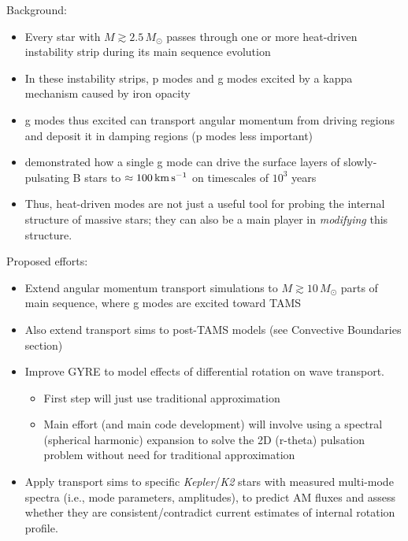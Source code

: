 {Background:
 \begin{itemize}
 \item Every star with $M \gtrsim 2.5\,M_{\odot}$ passes through one or more heat-driven instability strip during its main sequence evolution
 \item In these instability strips, p modes and g modes excited by a kappa mechanism caused by iron opacity
 \item g modes thus excited can transport angular momentum from driving regions and deposit it in damping regions (p modes less important)
 \item \citet{Townsend:2017aa} demonstrated how a single g mode can drive the surface layers of slowly-pulsating B stars to $\approx 100\,{\rm km\,s^{-1}}$ on timescales of $10^{3}$ years
 \item Thus, heat-driven modes are not just a useful tool for probing the internal structure of massive stars; they can also be a main player in \emph{modifying} this structure.
 \end{itemize}
 
 Proposed efforts:
 \begin{itemize}
 \item Extend angular momentum transport simulations to $M \gtrsim 10\,M_{\odot}$ parts of main sequence, where g modes are excited toward TAMS
 \item Also extend transport sims to post-TAMS models (see Convective Boundaries section)
 \item Improve GYRE to model effects of differential rotation on wave transport.
 \begin{itemize}
 \item First step will just use traditional approximation
 \item Main effort (and main code development) will involve using a spectral (spherical harmonic) expansion to solve the 2D (r-theta) pulsation problem without need for traditional approximation
 \end{itemize}
 \item Apply transport sims to specific \emph{Kepler}/\emph{K2} stars with measured multi-mode spectra (i.e., mode parameters, amplitudes), to predict AM fluxes and assess whether they are consistent/contradict current estimates of internal rotation profile.
 \end{itemize}


    
}




